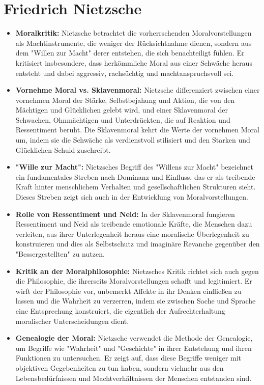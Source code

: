 \documentclass{article}
\begin{document}
\section{Friedrich Nietzsche}

\begin{itemize}
	\item \textbf{Moralkritik:}
	      Nietzsche betrachtet die vorherrschenden Moralvorstellungen als Machtinstrumente, die weniger der Rücksichtnahme dienen, sondern aus dem "Willen zur Macht" derer entstehen, die sich benachteiligt fühlen. Er kritisiert insbesondere, dass herkömmliche Moral aus einer Schwäche heraus entsteht und dabei aggressiv, rachsüchtig und machtanspruchsvoll sei.

	\item \textbf{Vornehme Moral vs. Sklavenmoral:}
	      Nietzsche differenziert zwischen einer vornehmen Moral der Stärke, Selbstbejahung und Aktion, die von den Mächtigen und Glücklichen gelebt wird, und einer Sklavenmoral der Schwachen, Ohnmächtigen und Unterdrückten, die auf Reaktion und Ressentiment beruht. Die Sklavenmoral kehrt die Werte der vornehmen Moral um, indem sie die Schwäche als verdienstvoll stilisiert und den Starken und Glücklichen Schuld zuschreibt.

	\item \textbf{"Wille zur Macht":}
	      Nietzsches Begriff des "Willens zur Macht" bezeichnet ein fundamentales Streben nach Dominanz und Einfluss, das er als treibende Kraft hinter menschlichem Verhalten und gesellschaftlichen Strukturen sieht. Dieses Streben zeigt sich auch in der Entwicklung von Moralvorstellungen.

	\item \textbf{Rolle von Ressentiment und Neid:}
	      In der Sklavenmoral fungieren Ressentiment und Neid als treibende emotionale Kräfte, die Menschen dazu verleiten, aus ihrer Unterlegenheit heraus eine moralische Überlegenheit zu konstruieren und dies als Selbstschutz und imaginäre Revanche gegenüber den "Bessergestellten" zu nutzen.

	\item \textbf{Kritik an der Moralphilosophie:}
	      Nietzsches Kritik richtet sich auch gegen die Philosophie, die ihrerseits Moralvorstellungen schafft und legitimiert. Er wirft der Philosophie vor, unbemerkt Affekte in ihr Denken einfließen zu lassen und die Wahrheit zu verzerren, indem sie zwischen Sache und Sprache eine Entsprechung konstruiert, die eigentlich der Aufrechterhaltung moralischer Unterscheidungen dient.

	\item \textbf{Genealogie der Moral:}
	      Nietzsche verwendet die Methode der Genealogie, um Begriffe wie "Wahrheit" und "Geschichte" in ihrer Entstehung und ihren Funktionen zu untersuchen. Er zeigt auf, dass diese Begriffe weniger mit objektiven Gegebenheiten zu tun haben, sondern vielmehr aus den Lebensbedürfnissen und Machtverhältnissen der Menschen entstanden sind.
\end{itemize}
\end{document}
